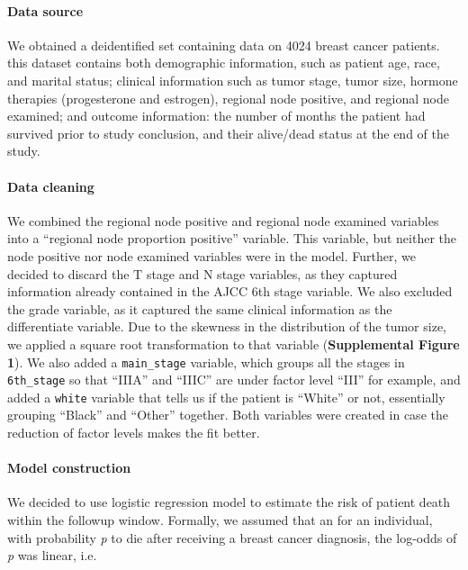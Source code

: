 \documentclass[]{article}
\let\oldparagraph\paragraph
\renewcommand{\paragraph}[1]{\oldparagraph{#1}\mbox{}}
\begin{document}
\hypertarget{data-source}{%
\paragraph{Data source}\label{data-source}}

We obtained a deidentified set containing data on 4024 breast cancer
patients. this dataset contains both demographic information, such as
patient age, race, and marital status; clinical information such as
tumor stage, tumor size, hormone therapies (progesterone and estrogen),
regional node positive, and regional node examined; and outcome
information: the number of months the patient had survived prior to
study conclusion, and their alive/dead status at the end of the study.

\hypertarget{data-cleaning}{%
\paragraph{Data cleaning}\label{data-cleaning}}

We combined the regional node positive and regional node examined
variables into a ``regional node proportion positive'' variable. This
variable, but neither the node positive nor node examined variables were
in the model. Further, we decided to discard the T stage and N stage
variables, as they captured information already contained in the AJCC
6th stage variable. We also excluded the grade variable, as it captured
the same clinical information as the differentiate variable. Due to the
skewness in the distribution of the tumor size, we applied a square root
transformation to that variable (\textbf{Supplemental Figure 1}). We
also added a \texttt{main\_stage} variable, which groups all the stages
in \texttt{6th\_stage} so that ``IIIA'' and ``IIIC'' are under factor
level ``III'' for example, and added a \texttt{white} variable that
tells us if the patient is ``White'' or not, essentially grouping
``Black'' and ``Other'' together. Both variables were created in case
the reduction of factor levels makes the fit better.

\hypertarget{model-construction}{%
\paragraph{Model construction}\label{model-construction}}

We decided to use logistic regression model to estimate the risk of
patient death within the followup window. Formally, we assumed that an
for an individual, with probability \emph{p} to die after receiving a
breast cancer diagnosis, the log-odds of \emph{p} was linear, i.e.
\end{document}
